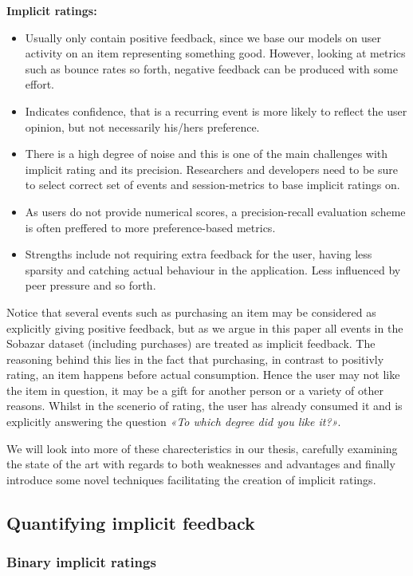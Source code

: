 \textbf{Implicit ratings:}
\begin{itemize}
\item Usually only contain positive feedback, since we base our models on user
activity on an item representing something good. However, looking at metrics
such as bounce rates so forth, negative feedback can be produced with some
effort.
\item Indicates confidence, that is a recurring event is more likely to reflect
the user opinion, but not necessarily his/hers preference.
\item There is a high degree of noise and this is one of the main challenges
with implicit rating and its precision. Researchers and developers need to be
sure to select correct set of events and session-metrics to base implicit
ratings on.
\item As users do not provide numerical scores, a precision-recall evaluation
scheme is often preffered to more preference-based metrics.
\item Strengths include not requiring extra feedback for the user, having less
sparsity and catching actual behaviour in the application. Less influenced by
peer pressure and so forth.
\end{itemize}

Notice that several events such as purchasing an item may be considered as
explicitly giving positive feedback, but as we argue in this paper all events
in the Sobazar dataset (including purchases) are treated as implicit feedback.
The reasoning behind this lies in the fact that purchasing, in contrast to
positivly rating, an item happens before actual consumption. Hence the user may
not like the item in question, it may be a gift for another person or a variety
of other reasons. Whilst in the scenerio of rating, the user has already
consumed it and is explicitly answering the question \textit{«To which degree
did you like it?»}.

We will look into more of these charecteristics in our thesis, carefully
examining the state of the art with regards to both weaknesses and advantages
and finally introduce some novel techniques facilitating the creation of
implicit ratings.

\clearpage

\subsection{Quantifying implicit feedback}

\subsubsection{Binary implicit ratings}

